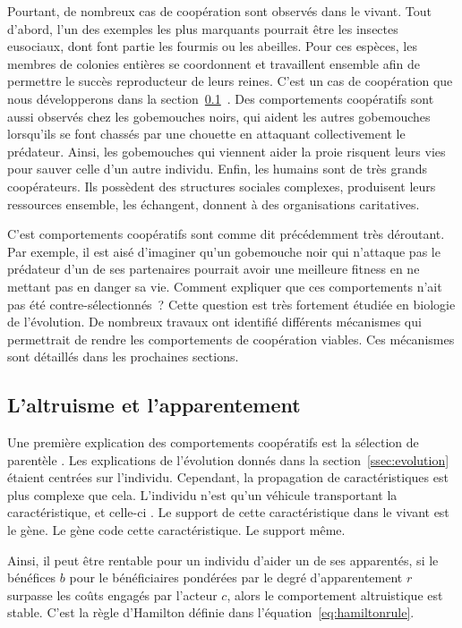 Pourtant, de nombreux cas de coopération sont observés dans le vivant. Tout d'abord, l'un des exemples les plus marquants pourrait être les insectes eusociaux, dont font partie les fourmis ou les abeilles. Pour ces espèces, les membres de colonies entières se coordonnent et travaillent ensemble afin de permettre le succès reproducteur de leurs reines. C'est un cas de coopération que nous développerons dans la section~\ref{ssec:altruism_kin}~\emph{}. Des comportements coopératifs sont aussi observés chez les gobemouches noirs, qui aident les autres gobemouches lorsqu'ils se font chassés par une chouette en attaquant collectivement le prédateur.  Ainsi, les gobemouches qui viennent aider la proie risquent leurs vies pour sauver celle d'un autre individu. Enfin, les humains sont de très grands coopérateurs. Ils possèdent des structures sociales complexes, produisent leurs ressources ensemble, les échangent, donnent à des organisations caritatives.


C'est comportements coopératifs sont comme dit précédemment très déroutant. Par exemple, il est aisé d'imaginer qu'un gobemouche noir qui n'attaque pas le prédateur d'un de ses partenaires pourrait avoir une meilleure fitness en ne mettant pas en danger sa vie. Comment expliquer que ces comportements n'ait pas été contre-sélectionnés ? Cette question est très fortement étudiée en biologie de l'évolution. De nombreux travaux ont identifié différents mécanismes qui permettrait de rendre les comportements de coopération viables. Ces mécanismes sont détaillés dans les prochaines sections.



\subsection{L'altruisme et l'apparentement}
\label{ssec:altruism_kin}

Une première explication des comportements coopératifs est la sélection de parentèle \citep{Hamilton1964}. Les explications de l'évolution donnés dans la section~\ref{ssec:evolution}~\emph{} étaient centrées sur l'individu. Cependant, la propagation de caractéristiques est plus complexe que cela. L'individu n'est qu'un véhicule transportant la caractéristique, et celle-ci . Le support de cette caractéristique dans le vivant est le gène. Le gène code cette caractéristique. Le support même.  

Ainsi, il peut être rentable pour un individu d'aider un de ses apparentés, si le bénéfices $b$ pour le bénéficiaires pondérées par le degré d'apparentement $r$ surpasse les coûts engagés par l'acteur $c$, alors le comportement altruistique est stable. C'est la règle d'Hamilton définie dans l'équation~\ref{eq:hamiltonrule}.

